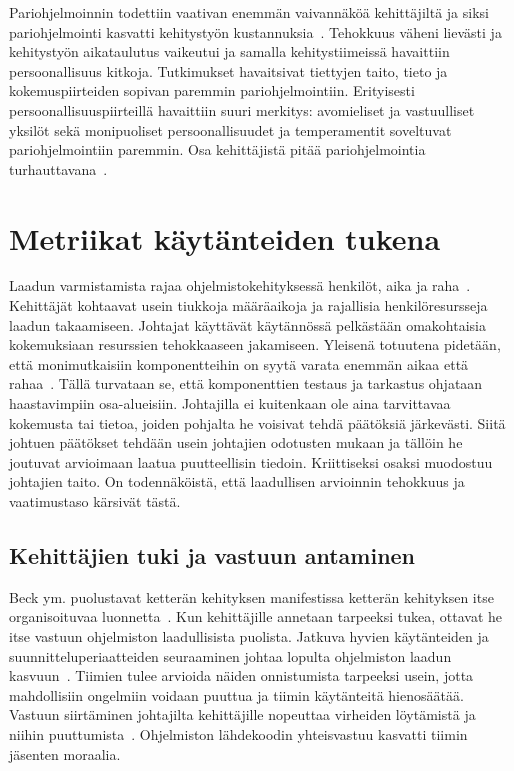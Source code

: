 \documentclass[finnish]{../tktltiki2}
\theoremstyle{definition}
\theoremstyle{remark}
\begin{document}
    Pariohjelmoinnin todettiin vaativan enemmän vaivannäköä kehittäjiltä ja siksi pariohjelmointi kasvatti kehitystyön 
kustannuksia~\cite{SS10}. Tehokkuus väheni lievästi ja kehitystyön aikataulutus vaikeutui ja samalla kehitystiimeissä 
havaittiin persoonallisuus kitkoja. Tutkimukset havaitsivat tiettyjen taito, tieto ja kokemuspiirteiden sopivan paremmin 
pariohjelmointiin. Erityisesti persoonallisuuspiirteillä havaittiin suuri merkitys: avomieliset ja vastuulliset yksilöt 
sekä monipuoliset persoonallisuudet ja temperamentit soveltuvat pariohjelmointiin paremmin. Osa kehittäjistä pitää 
pariohjelmointia turhauttavana~\cite{DD08}.

\section{Metriikat käytänteiden tukena}

Laadun varmistamista rajaa ohjelmistokehityksessä henkilöt, aika ja raha~\cite{BBM96, ZN08}. Kehittäjät kohtaavat usein 
tiukkoja määräaikoja ja rajallisia henkilöresursseja laadun takaamiseen. Johtajat käyttävät käytännössä pelkästään 
omakohtaisia kokemuksiaan resurssien tehokkaaseen jakamiseen. Yleisenä totuutena pidetään, että monimutkaisiin 
komponentteihin on syytä varata enemmän aikaa että rahaa~\cite{BBM96, ZN08}. Tällä turvataan se, että komponenttien 
testaus ja tarkastus ohjataan haastavimpiin osa-alueisiin. Johtajilla ei kuitenkaan ole aina tarvittavaa kokemusta tai 
tietoa, joiden pohjalta he voisivat tehdä päätöksiä järkevästi. Siitä johtuen päätökset tehdään usein johtajien 
odotusten mukaan ja tällöin he joutuvat arvioimaan laatua puutteellisin tiedoin. Kriittiseksi osaksi muodostuu johtajien 
taito. On todennäköistä, että laadullisen arvioinnin tehokkuus ja vaatimustaso kärsivät tästä.

\subsection{Kehittäjien tuki ja vastuun antaminen}

Beck ym. puolustavat ketterän kehityksen manifestissa ketterän kehityksen itse organisoituvaa luonnetta~\cite{BBB01}. 
Kun kehittäjille annetaan tarpeeksi tukea, ottavat he itse vastuun ohjelmiston laadullisista puolista. Jatkuva hyvien 
käytänteiden ja suunnitteluperiaatteiden seuraaminen johtaa lopulta ohjelmiston laadun kasvuun~\cite{SS10}. Tiimien 
tulee arvioida näiden onnistumista tarpeeksi usein, jotta mahdollisiin ongelmiin voidaan puuttua ja tiimin käytänteitä 
hienosäätää. Vastuun siirtäminen johtajilta kehittäjille nopeuttaa virheiden löytämistä ja niihin 
puuttumista~\cite{DD08}. Ohjelmiston lähdekoodin yhteisvastuu kasvatti tiimin jäsenten moraalia.
\end{document}
